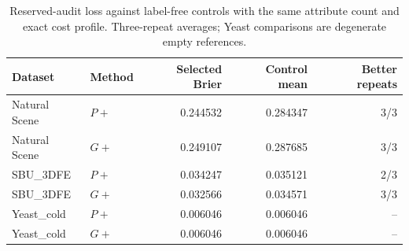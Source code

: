 \begin{table}[htbp]
\centering\small\renewcommand{\arraystretch}{1.3}\setlength{\tabcolsep}{5pt}
\caption{Reserved-audit loss against label-free controls with the same attribute count and exact cost profile. Three-repeat averages; Yeast comparisons are degenerate empty references.}
\label{tab:reserved}
\begin{tabular}{llrrr}
\hline
Dataset & Method & Selected Brier & Control mean & Better repeats\\
\hline
Natural Scene & $P+$ & 0.244532 & 0.284347 & 3/3\\
Natural Scene & $G+$ & 0.249107 & 0.287685 & 3/3\\
SBU\_3DFE & $P+$ & 0.034247 & 0.035121 & 2/3\\
SBU\_3DFE & $G+$ & 0.032566 & 0.034571 & 3/3\\
Yeast\_cold & $P+$ & 0.006046 & 0.006046 & --\\
Yeast\_cold & $G+$ & 0.006046 & 0.006046 & --\\
\hline
\end{tabular}
\end{table}
